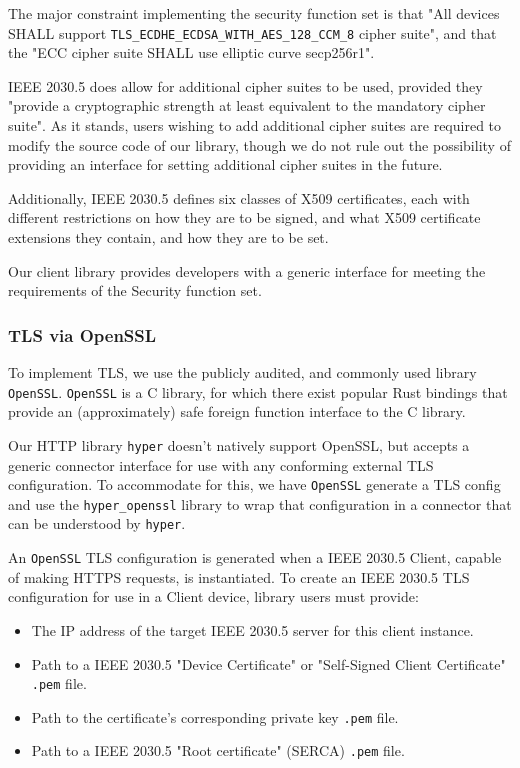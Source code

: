 The major constraint implementing the security function set is that "All devices SHALL support \texttt{TLS\_ECDHE\_ECDSA\_WITH\_AES\_128\_CCM\_8} cipher suite", and that the "ECC cipher suite SHALL use elliptic curve secp256r1".\cite{IEEE2030.5}

IEEE 2030.5 does allow for additional cipher suites to be used, provided they "provide a cryptographic strength at least equivalent to the mandatory cipher suite". \cite{IEEE2030.5} As it stands, users wishing to add additional cipher suites are required to modify the source code of our library, though we do not rule out the possibility of providing an interface for setting additional cipher suites in the future.

Additionally, IEEE 2030.5 defines six classes of X509 certificates, each with different restrictions on how they are to be signed, and what  X509 certificate extensions they contain, and how they are to be set.

Our client library provides developers with a generic interface for meeting the requirements of the Security function set.

\subsubsection{TLS via OpenSSL}
To implement TLS, we use the publicly audited, and commonly used library \texttt{OpenSSL}. \texttt{OpenSSL} is a C library, for which there exist popular Rust bindings that provide an (approximately) safe foreign function interface to the C library. \cite{openssl}

Our HTTP library \texttt{hyper} doesn't natively support OpenSSL, but accepts a generic connector interface for use with any conforming external TLS configuration. To accommodate for this, we have \texttt{OpenSSL} generate a TLS config and use the \texttt{hyper\_openssl} library to wrap that configuration in a connector that can be understood by \texttt{hyper}. \cite{hyperopenssl}

An \texttt{OpenSSL} TLS configuration is generated when a IEEE 2030.5 Client, capable of making HTTPS requests, is instantiated. To create an IEEE 2030.5 TLS configuration for use in a Client device, library users must provide:

\begin{itemize}
    \item The IP address of the target IEEE 2030.5 server for this client instance.
    \item Path to a IEEE 2030.5 "Device Certificate" or "Self-Signed Client Certificate" \texttt{.pem} file.
    \item Path to the certificate's corresponding private key \texttt{.pem} file.
    \item Path to a IEEE 2030.5 "Root certificate" (SERCA) \texttt{.pem} file. 
\end{itemize}

